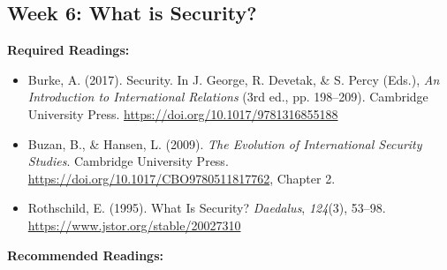 \documentclass[
  letterpaper,
  DIV=11,
  numbers=noendperiod]{scrartcl}
\providecommand{\tightlist}{%
  \setlength{\itemsep}{0pt}\setlength{\parskip}{0pt}}\usepackage{longtable,booktabs,array}
\begin{document}
\hypertarget{week-6-what-is-security}{%
\subsection*{Week 6: What is Security?}\label{week-6-what-is-security}}

\textbf{Required Readings:}

\begin{itemize}
\tightlist
\item
  Burke, A. (2017). Security. In J. George, R. Devetak, \& S. Percy
  (Eds.), \emph{An {Introduction} to {International} {Relations}} (3rd
  ed., pp. 198--209). Cambridge University Press.
  \url{https://doi.org/10.1017/9781316855188}
\item
  Buzan, B., \& Hansen, L. (2009). \emph{The {Evolution} of
  {International} {Security} {Studies}}. Cambridge University Press.
  \url{https://doi.org/10.1017/CBO9780511817762}, Chapter 2.
\item
  Rothschild, E. (1995). What {Is} {Security}? \emph{Daedalus},
  \emph{124}(3), 53--98. \url{https://www.jstor.org/stable/20027310}
\end{itemize}

\textbf{Recommended Readings:}
\end{document}
